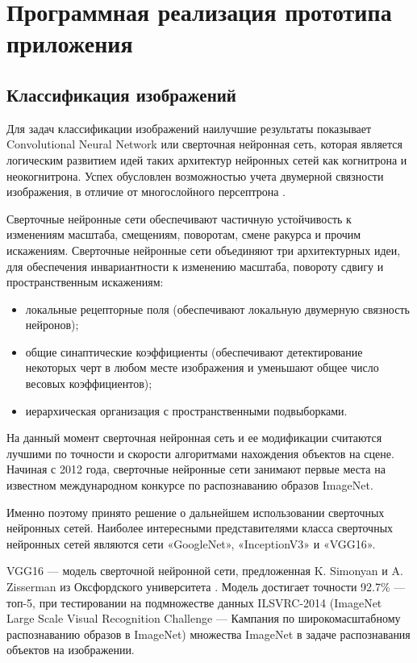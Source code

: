 \section{Программная реализация прототипа приложения}

\subsection{Классификация изображений}

Для задач классификации изображений наилучшие результаты показывает Convolutional Neural Network или сверточная нейронная сеть, которая является логическим развитием идей таких архитектур нейронных сетей как когнитрона и неокогнитрона. 
Успех обусловлен возможностью учета двумерной связности изображения, в отличие от многослойного персептрона \cite{conv-neoro}. 

Сверточные нейронные сети обеспечивают частичную устойчивость к изменениям масштаба, смещениям, поворотам, смене ракурса и прочим искажениям. 
Сверточные нейронные сети объединяют три архитектурных идеи, для обеспечения инвариантности к изменению масштаба, повороту сдвигу и пространственным искажениям:
\begin{itemize}
    \item локальные рецепторные поля (обеспечивают локальную двумерную связность нейронов);
    \item общие синаптические коэффициенты (обеспечивают детектирование некоторых черт в любом месте изображения и уменьшают общее число весовых коэффициентов);
    \item иерархическая организация с пространственными подвыборками.
\end{itemize}

На данный момент сверточная нейронная сеть и ее модификации считаются лучшими по точности и скорости алгоритмами нахождения объектов на сцене. 
Начиная с 2012 года, сверточные нейронные сети занимают первые места на известном международном конкурсе по распознаванию образов ImageNet.

Именно поэтому принято решение о дальнейшем использовании сверточных нейронных сетей. 
Наиболее интересными представителями класса сверточных нейронных сетей являются сети «GoogleNet», «InceptionV3» и «VGG16».

VGG16 — модель сверточной нейронной сети, предложенная K. Simonyan и A. Zisserman из Оксфордского университета \cite{vgg16alg}. 
Модель достигает точности 92.7\% — топ-5, при тестировании на подмножестве данных ILSVRC-2014 (ImageNet Large Scale Visual Recognition Challenge — Кампания по широкомасштабному распознаванию образов в ImageNet) множества ImageNet в задаче распознавания объектов на изображении. 

